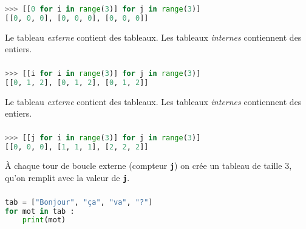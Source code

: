 \documentclass[svgnames,11pt]{beamer}
\begin{document}
\begin{frame}[fragile]
    \frametitle{}

\begin{center}
\begin{lstlisting}[language=Python , basicstyle=\ttfamily\small, xleftmargin=2em, xrightmargin=2em]
>>> [[0 for i in range(3)] for j in range(3)]
[[0, 0, 0], [0, 0, 0], [0, 0, 0]]
\end{lstlisting}
\end{center}
\begin{aretenir}[Remarque]
Le tableau \emph{externe} contient des tableaux. Les tableaux \emph{internes} contiennent des entiers.
\end{aretenir}
\end{frame}
\begin{frame}[fragile]
    \frametitle{}

\begin{center}
\begin{lstlisting}[language=Python , basicstyle=\ttfamily\small, xleftmargin=2em, xrightmargin=2em]
>>> [[i for i in range(3)] for j in range(3)]
[[0, 1, 2], [0, 1, 2], [0, 1, 2]]
\end{lstlisting}
\end{center}
\begin{aretenir}[Remarque]
Le tableau \emph{externe} contient des tableaux. Les tableaux \emph{internes} contiennent des entiers.
\end{aretenir}
\end{frame}
\begin{frame}[fragile]
    \frametitle{}

\begin{center}
\begin{lstlisting}[language=Python , basicstyle=\ttfamily\small, xleftmargin=2em, xrightmargin=2em]
>>> [[j for i in range(3)] for j in range(3)]
[[0, 0, 0], [1, 1, 1], [2, 2, 2]]
\end{lstlisting}
\end{center}
\begin{aretenir}[Remarque]
À chaque tour de boucle externe (compteur \textbf{\texttt{j}}) on crée un tableau de taille 3, qu'on remplit avec la valeur de \textbf{\texttt{j}}.
\end{aretenir}
\end{frame}
\begin{frame}[fragile]
    \frametitle{}

\begin{center}
\begin{lstlisting}[language=Python , basicstyle=\ttfamily\small, xleftmargin=2em, xrightmargin=2em]
tab = ["Bonjour", "ça", "va", "?"]
for mot in tab :
    print(mot)
\end{lstlisting}
\end{center}
\end{frame}
\end{document}
